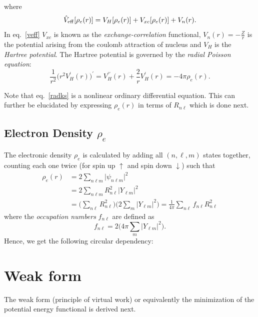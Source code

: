 \documentclass[12pt,dvipsnames]{article}
\begin{document}
where 
\begin{equation} \label{veff}
\hat{V}_{\rm{eff}}[\rho_e(r)] = V_H[\rho_e(r)] + V_{xc}[\rho_e(r)] + V_n(r).
\end{equation}
In eq.~\eqref{veff} $V_{xc}$ is known as the \emph{exchange-correlation} functional, 
$V_n(r) = -\frac{Z}{r}$ is the potential arising from the coulomb attraction of nucleus and $V_H$ is 
the \emph{Hartree potential}. The Hartree potential is governed by the \emph{radial Poisson 
equation}:
\begin{equation} \label{radpois}
\frac{1}{r^2} \Big( r^2 V^\prime_H(r) \Big)^\prime = V^{\prime \prime}_H (r) + \frac{2}{r} V^\prime_H(r) = -4 \pi \rho_e(r).
\end{equation}

\noindent
Note that eq.~\eqref{radks} is a nonlinear ordinary differential equation. This can further be 
elucidated by expressing $\rho_e(r)$ in terms of $R_{n \ell}$ which is done next. 
%
\subsection{Electron Density $\rho_e$} \label{sec:nonlin}
The electronic density $\rho_e$ is calculated by adding all $(n, \ell, m)$ states together, counting each one
twice (for spin up $\uparrow$ and spin down $\downarrow$) such that
\begin{align*}
\rho_e(r) & = 2 \sum\limits_{n \ell m} \vert \psi_{n \ell m} \vert^2 \\
& = 2 \sum\limits_{n \ell m}  R_{n \ell}^2 \vert Y_{\ell m} \vert^2\\
& = \Big( \sum\limits_{n \ell} R_{n \ell}^2 \Big) \Big(2 \sum\limits_m \vert Y_{\ell m} \vert^2 \Big) =  \frac{1}{4 \pi} \sum\limits_{n \ell} f_{n \ell} R_{n \ell}^2
\end{align*}
where the \emph{occupation numbers} $f_{n \ell}$ are defined as
\begin{equation}		\nonumber
f_{n \ell} = 2 \Big( 4 \pi \sum\limits_m \vert Y_{\ell m} \vert^2 \Big).
\end{equation}
Hence, we get the following circular dependency:\\
\begin{center}
\end{center}
%
%
\section{Weak form}
The weak form (principle of virtual work) or equivalently the minimization 
of the potential energy functional is derived next. 
%
\end{document}
